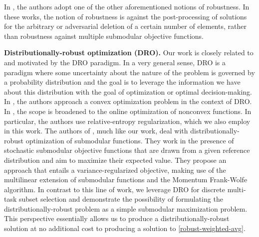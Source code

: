 \documentclass[letter,11pt]{article}
\begin{document}
In \cite{partitioning, removalrobust}, the authors adopt one of the other aforementioned notions of robustness. In these works, the notion of robustness is against the post-processing of solutions for the arbitrary or adversarial deletion of a certain number of elements, rather than robustness against multiple submodular objective functions.

\textbf{Distributionally-robust optimization (DRO).} Our work is closely related to and motivated by the DRO paradigm. In a very general sense, DRO is a paradigm where some uncertainty about the nature of the problem is governed by a probability distribution and the goal is to leverage the information we have about this distribution with the goal of optimization or optimal decision-making. In \cite{distributional-convex}, the authors approach a convex optimization problem in the context of DRO. In \cite{dro-nonconvex}, the scope is broadened to the online optimization of nonconvex functions. In particular, the authors use relative-entropy regularization, which we also employ in this work. The authors of \cite{pmlr-v89-staib19a}, much like our work, deal with distributionally-robust optimization of submodular functions. They work in the presence of stochastic submodular objective functions that are drawn from a given reference distribution and aim to maximize their expected value. They propose an approach that entails a variance-regularized objective, making use of the multilinear extension of submodular functions and the Momentum Frank-Wolfe algorithm. In contrast to this line of work, we leverage DRO for discrete multi-task subset selection and demonstrate the possibility of formulating the distributionally-robust problem as a simple submodular maximization problem. This perspective essentially allows us to produce a distributionally-robust solution at no additional cost to producing a solution to \eqref{robust-weighted-avg}.
\end{document}
